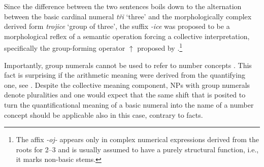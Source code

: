 \documentclass[output=paper]{langscibook}
\begin{document}
		\ea\label{ex:collective-czech} \label{ex:collective-czech-tri}
	\label{ex:collective-czech-trojice}
	\z
	\z
	
\noindent Since the difference between the two sentences boils down to the alternation between the basic cardinal numeral \textit{tři} `three' and the morphologically complex derived form \textit{trojice} `group of three', the suffix \textit{-ice} was proposed to be a morphological reflex of a semantic operation forcing a collective interpretation, specifically the group-forming operator $\uparrow$ proposed by \citet{landman1989groupsi}.\footnote{The affix \textit{-oj-} appears only in complex numerical expressions derived from the roots for 2--3 and is usually assumed to have a purely structural function, i.e., it marks non-basic stems.} 

Importantly, group numerals cannot be used to refer to number concepts . This fact is surprising if the arithmetic meaning were derived from the quantifying one, see . Despite the collective meaning component, NPs with group numerals denote pluralities and one would expect that the same shift that is posited to turn the quantificational meaning of a basic numeral into the name of a number concept should be applicable also in this case, contrary to facts. 
	
			\ea\label{ex:collective-czech-arithmetic} \label{ex:collective-czech-prime}
	\label{ex:collective-czech-math}
	\z
	\z
\end{document}
